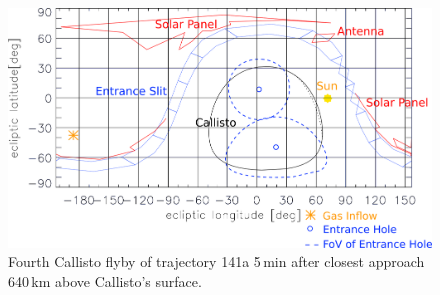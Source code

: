 	\begin{figure}[h!]
		\centering
		\includegraphics[width = .7\textwidth]{Bilder/NIM_pointing_2031JAN15195700.png}
		\caption{Fourth Callisto flyby of trajectory 141a \cite{SOC_Crema3p2} 5\,min after closest approach 640\,km above Callisto's surface.}
		\label{fig:FlybyCal1957}
	\end{figure}
